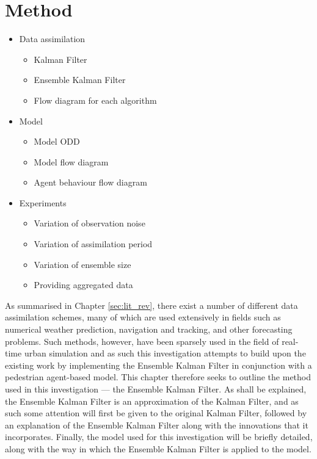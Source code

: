 \section{Method}\label{sec:method}

\begin{itemize}
    \item Data assimilation
    \begin{itemize}
        \item Kalman Filter
        \item Ensemble Kalman Filter
        \item Flow diagram for each algorithm
    \end{itemize}
    \item Model
    \begin{itemize}
        \item Model ODD
        \item Model flow diagram
        \item Agent behaviour flow diagram
    \end{itemize}
    \item Experiments
    \begin{itemize}
        \item Variation of observation noise
        \item Variation of assimilation period
        \item Variation of ensemble size
        \item Providing aggregated data
    \end{itemize}
\end{itemize}

As summarised in Chapter \ref{sec:lit_rev}, there exist a number of different
data assimilation schemes, many of which are used extensively in fields such as
numerical weather prediction, navigation and tracking, and other forecasting
problems.
Such methods, however, have been sparsely used in the field of real-time urban
simulation and as such this investigation attempts to build upon the existing
work by implementing the Ensemble Kalman Filter in conjunction with a pedestrian
agent-based model.
This chapter therefore seeks to outline the method used in this investigation --- the
Ensemble Kalman Filter. 
As shall be explained, the Ensemble Kalman Filter is an approximation of the
Kalman Filter, and as such some attention will first be given to the original
Kalman Filter, followed by an explanation of the Ensemble Kalman Filter along
with the innovations that it incorporates.
Finally, the model used for this investigation will be briefly detailed, along
with the way in which the Ensemble Kalman Filter is applied to the model.

